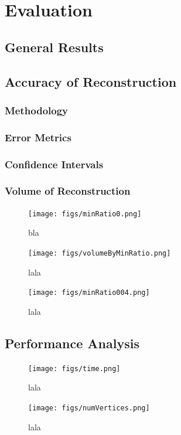 \documentclass[12pt,a4paper,twoside,openright]{report}
\begin{document}
\chapter{Evaluation}
\section{General Results}

\section{Accuracy of Reconstruction}
\subsection{Methodology}
\subsection{Error Metrics}
\subsection{Confidence Intervals}
\subsection{Volume of Reconstruction}
\begin{figure}
\begin{center}
\texttt{[image: figs/minRatio0.png]}	
\caption{bla}
\end{center}
\end{figure}

\begin{figure}
\begin{center}
\texttt{[image: figs/volumeByMinRatio.png]}	
\caption{lala}
\end{center}
\end{figure}

\begin{figure}
\begin{center}
\texttt{[image: figs/minRatio004.png]}	
\caption{lala}
\end{center}
\end{figure}

\section{Performance Analysis}
\begin{figure}
\begin{center}
\texttt{[image: figs/time.png]}	
\caption{lala}
\end{center}
\end{figure}
\begin{figure}
\begin{center}
\texttt{[image: figs/numVertices.png]}	
\caption{lala}
\end{center}
\end{figure}
\end{document}
